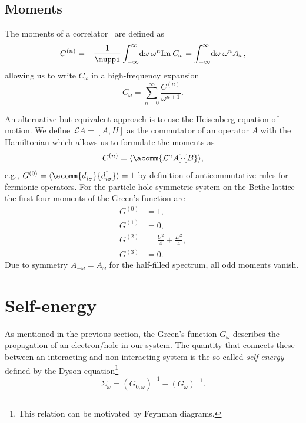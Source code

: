 \subsection{Moments}%
\label{sec:moments}

The moments of a correlator~\cite{Lu2014,Kugler2022,Potthoff1997} are defined as
\begin{equation}
    C^{(n)}
    =
    -\frac{1}{\muppi} \int_{-\infty}^\infty\! \md\omega\> \omega^n \Im C_\omega
    =
    \int_{-\infty}^\infty\! \md\omega\> \omega^n A_\omega,
    \label{eq:moments}
\end{equation}
allowing us to write $C_\omega$ in a high-frequency expansion~\cite{Potthoff1997}
\begin{equation}
    C_\omega = \sum_{n=0}^\infty \frac{C^{(n)}}{\omega^{n+1}}.
    \label{eq:expansion-correlator}
\end{equation}

An alternative but equivalent approach is to use the Heisenberg equation of motion.
We define $\mathcal{L}A = [A, H]$ as the commutator of an operator $A$ with the Hamiltonian
which allows us to formulate the moments as~\cite{Potthoff1997}
\begin{equation}
    C^{(n)} = \expval{\acomm{\mathcal{L}^n A}{B}},
\end{equation}
e.g., $G^{(0)} = \expval{\acomm{d^{\pdag}_{i\sigma}}{d^\dag_{i\sigma}}} = 1$
by definition of anticommutative rules for fermionic operators.
For the particle-hole symmetric system on the Bethe lattice
the first four moments of the Green's function are~\cite{Potthoff1997}
\begin{subequations}
    \begin{align}
        G^{(0)} & = 1,                             \\
        G^{(1)} & = 0,                             \\
        G^{(2)} & = \frac{U^2}{4} + \frac{D^2}{4}, \\
        G^{(3)} & = 0.
    \end{align}%
    \label{eq:spectrum-moments}%
\end{subequations}
Due to symmetry $A_{-\omega} = A_\omega$ for the half-filled spectrum,
all odd moments vanish.

\section{Self-energy}

As mentioned in the previous section,
the Green's function $G_\omega$ describes the propagation of an electron/hole in our system.
The quantity that connects these between an interacting and non-interacting system
is the so-called \emph{self-energy} defined by the Dyson equation\footnote{
    This relation can be motivated by Feynman diagrams.
}~\cite{Economou2006}
\begin{equation}
    \Sigma_\omega = (G_{0, \omega})^{-1} - (G_\omega)^{-1}.
    \label{eq:Dyson}
\end{equation}


